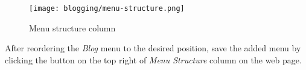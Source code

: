 \begin{figure}[ht]
\caption{Menu structure column}
\label{fig:menu-structure}
\centering
\texttt{[image: blogging/menu-structure.png]}
\end{figure}

After reordering the \emph{Blog} menu to the desired position, save the added menu by clicking the  button on the top right of \emph{Menu Structure} column on the web page.
